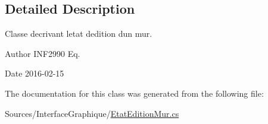\subsection{Detailed Description}
Classe decrivant l\textquotesingle{}etat d\textquotesingle{}edition d\textquotesingle{}un mur. 

\begin{DoxyAuthor}{Author}
I\+N\+F2990 Eq. 
\end{DoxyAuthor}
\begin{DoxyDate}{Date}
2016-\/02-\/15 
\end{DoxyDate}


The documentation for this class was generated from the following file\+:\begin{DoxyCompactItemize}
\item 
Sources/\+Interface\+Graphique/\hyperlink{_etat_edition_mur_8cs}{Etat\+Edition\+Mur.\+cs}\end{DoxyCompactItemize}
